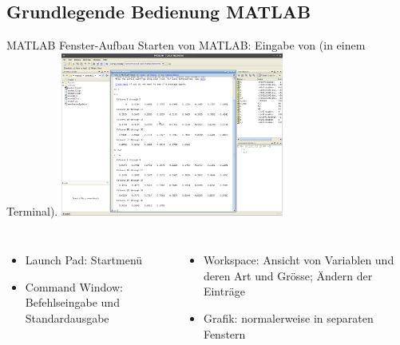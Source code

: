\documentclass[hyperref={xetex}]{beamer}
\begin{document}
\subsection{Grundlegende Bedienung MATLAB}
\begin{frame}[fragile]{MATLAB Fenster-Aufbau}
Starten von MATLAB: Eingabe von  (in einem Terminal).
\centering\includegraphics[width=0.55\textwidth]{figures/Screenshot-MATLAB}

\begin{columns}[c]
\begin{itemize}
\item \alert{Launch Pad:} Startmenü
\item \alert{Command Window:} Befehlseingabe und Standardausgabe
\end{itemize}
\begin{itemize}
\item \alert{Workspace:} Ansicht von Variablen und deren Art und Grösse; Ändern der
Einträge 
\item \alert{Grafik:} normalerweise in separaten Fenstern
\end{itemize}

\end{columns}
\end{frame}

\end{document}
